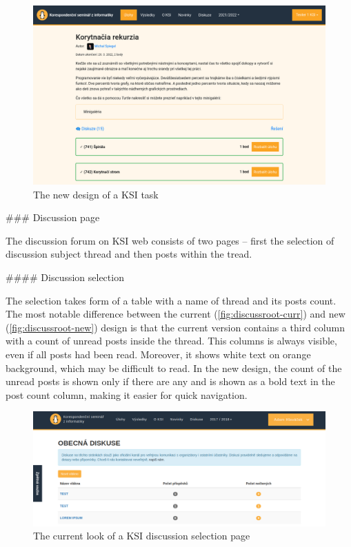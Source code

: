 \documentclass[
  digital, %
  oneside, %
  lof,     %
  lot,     %
]{fithesis4}
\begin{document}
{\begin{figure}
\includegraphics[width=\textwidth]{assets/img/task-new}
\caption{The new design of a KSI task}
\label{fig:task-new}
\end{figure}


### Discussion page

The discussion forum on KSI web consists of two pages -- first the selection of discussion subject thread and then posts within the tread.

#### Discussion selection

The selection takes form of a table with a name of thread and its posts count. The most notable difference between the current (\autoref{fig:discussroot-curr}) and new (\autoref{fig:discussroot-new}) design is that the current version contains a third column with a count of unread posts inside the thread. This columns is always visible, even if all posts had been read. Moreover, it shows white text on orange background, which may be difficult to read. In the new design, the count of the unread posts is shown only if there are any and is shown as a bold text in the post count column, making it easier for quick navigation.

\begin{figure}
\includegraphics[width=\textwidth]{assets/img/discussionroot-curr}
\caption{The current look of a KSI discussion selection page}
\label{fig:discussroot-curr}
\end{figure}

}
\end{document}
